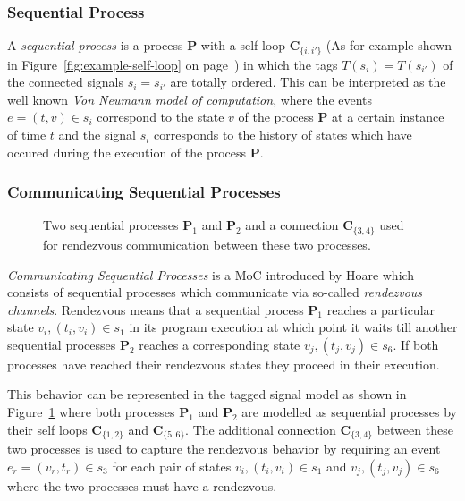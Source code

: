 \subsubsection*{Sequential Process}
A \emph{sequential process} is a process $\mathbf{P}$ with a self loop $\mathbf{C}_{\{i,i'\}}$
(As for example shown in Figure~\ref{fig:example-self-loop} on page~\pageref{fig:example-self-loop}) in which
the tags $T(s_i) = T(s_{i'})$ of the connected signals $s_i = s_{i'}$ are totally ordered.
This can be interpreted as the well known \emph{Von Neumann model of computation}, where the
events $e = (t,v) \in s_i$ correspond to the state $v$ of the process $\mathbf{P}$ at a certain
instance of time $t$ and the signal $s_i$ corresponds to the history of states which
have occured during the execution of the process $\mathbf{P}$.

\subsubsection*{Communicating Sequential Processes}

\begin{figure}[htb]
\centering

\caption{Two sequential processes $\mathbf{P}_1$ and $\mathbf{P}_2$
         and a connection $\mathbf{C}_{\{3,4\}}$ used for rendezvous
         communication between these two processes. \label{fig:example-csp-tsm}}
\end{figure}

\emph{Communicating Sequential Processes} is a MoC introduced by Hoare
\cite{csphoare:1985} which consists of sequential processes which communicate
via so-called \emph{rendezvous channels}. Rendezvous means that a sequential
process $\mathbf{P}_1$
reaches a particular state $v_i, (t_i,v_i) \in s_1$ in its program execution
at which point it waits till another sequential processes $\mathbf{P}_2$
reaches a corresponding state $v_j, (t_j,v_j) \in s_6$. If both processes
have reached their rendezvous states they proceed in their execution.

This behavior can be represented in the tagged signal model as shown in
Figure~\ref{fig:example-csp-tsm} where both processes $\mathbf{P}_1$ and
$\mathbf{P}_2$ are modelled as sequential processes by their self loops
$\mathbf{C}_{\{1,2\}}$ and $\mathbf{C}_{\{5,6\}}$. The additional connection
$\mathbf{C}_{\{3,4\}}$ between these two processes is used to capture the
rendezvous behavior by requiring an event $e_r = (v_r,t_r) \in s_3$ for
each pair of states $v_i, (t_i,v_i) \in s_1$ and $v_j, (t_j,v_j) \in s_6$
where the two processes must have a rendezvous.

